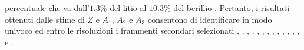 \documentclass[12pt,a4paper,twoside]{report}
\newcommand{\matr}[1]{\boldsymbol{#1}}
\newcommand{\transp}[1]{{#1}^{\mathsf{T}}}
\newcommand{\vect}[1]{\boldsymbol{#1}}
\begin{document}
percentuale che va dall'$1.3\%$ del litio  al $10.3\%$ del berillio . Pertanto, i risultati ottenuti dalle stime di $Z$ e $A_1$, $A_2$ e $A_3$ consentono di identificare in modo univoco ed entro le risoluzioni i frammenti secondari selezionati , , , , , , , , , , , , ,  e .
%		
\end{document}
